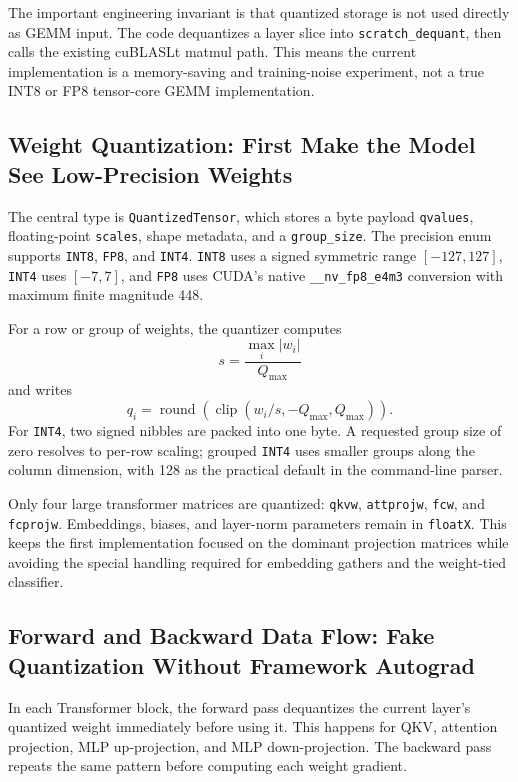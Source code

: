 \documentclass{article}
\begin{document}
The important engineering invariant is that quantized storage is not used directly as GEMM
input. The code dequantizes a layer slice into \texttt{scratch\_dequant}, then calls the
existing cuBLASLt matmul path. This means the current implementation is a memory-saving and
training-noise experiment, not a true INT8 or FP8 tensor-core GEMM implementation.

\subsection{Weight Quantization: First Make the Model See Low-Precision Weights}

The central type is \texttt{QuantizedTensor}, which stores a byte payload
\texttt{qvalues}, floating-point \texttt{scales}, shape metadata, and a
\texttt{group\_size}. The precision enum supports \texttt{INT8}, \texttt{FP8}, and
\texttt{INT4}. \texttt{INT8} uses a signed symmetric range $[-127,127]$, \texttt{INT4}
uses $[-7,7]$, and \texttt{FP8} uses CUDA's native \texttt{\_\_nv\_fp8\_e4m3}
conversion with maximum finite magnitude 448.

For a row or group of weights, the quantizer computes
\[
  s = \frac{\max_i |w_i|}{Q_{\max}}
\]
and writes
\[
  q_i = \operatorname{round}\left(\operatorname{clip}(w_i/s, -Q_{\max}, Q_{\max})\right).
\]
For \texttt{INT4}, two signed nibbles are packed into one byte. A requested group size of
zero resolves to per-row scaling; grouped \texttt{INT4} uses smaller groups along the
column dimension, with 128 as the practical default in the command-line parser.

Only four large transformer matrices are quantized: \texttt{qkvw}, \texttt{attprojw},
\texttt{fcw}, and \texttt{fcprojw}. Embeddings, biases, and layer-norm parameters remain in
\texttt{floatX}. This keeps the first implementation focused on the dominant projection
matrices while avoiding the special handling required for embedding gathers and the
weight-tied classifier.

\subsection{Forward and Backward Data Flow: Fake Quantization Without Framework Autograd}

In each Transformer block, the forward pass dequantizes the current layer's quantized weight
immediately before using it. This happens for QKV, attention projection, MLP up-projection,
and MLP down-projection. The backward pass repeats the same pattern before computing each
weight gradient.
\end{document}
